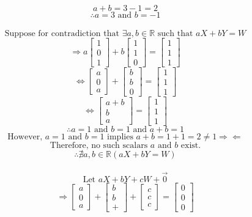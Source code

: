 \documentclass{article}
\newcommand{\R}{\mathbb{R}} %
\begin{document}
$$a+b=3-1=2$$
$$\therefore a=3\text{ and }b=-1$$\\
\vspace{3mm}
$$\text{Suppose for contradiction that }\exists a,b\in\R\text{ such that }aX+bY=W$$
$$\Longrightarrow a\begin{bmatrix}1\\0\\1\end{bmatrix}+b\begin{bmatrix}1\\1\\0\end{bmatrix}=\begin{bmatrix}1\\1\\1\end{bmatrix}$$
$$\Longleftrightarrow\begin{bmatrix}a\\0\\a\end{bmatrix}+\begin{bmatrix}b\\b\\0\end{bmatrix}=\begin{bmatrix}1\\1\\1\end{bmatrix}$$
$$\Longleftrightarrow\begin{bmatrix}a+b\\b\\a\end{bmatrix}=\begin{bmatrix}1\\1\\1\end{bmatrix}$$
$$\therefore a=1\text{ and }b=1\text{ and }a+b=1$$
$$\text{However, }a=1\text{ and }b=1\text{ implies }a+b=1+1=2\neq1\Rightarrow\Leftarrow$$
$$\text{Therefore, no such scalars }a\text{ and }b\text{ exist.}$$
$$\therefore\nexists a,b\in\R(aX+bY=W)$$\\
\vspace{3mm}
$$\text{Let }aX+bY+cW+\vec{0}$$
$$\Rightarrow\begin{bmatrix}a\\0\\a\end{bmatrix}+\begin{bmatrix}b\\b\\+\end{bmatrix}+\begin{bmatrix}c\\c\\c\end{bmatrix}=\begin{bmatrix}0\\0\\0\end{bmatrix}$$
\end{document}
